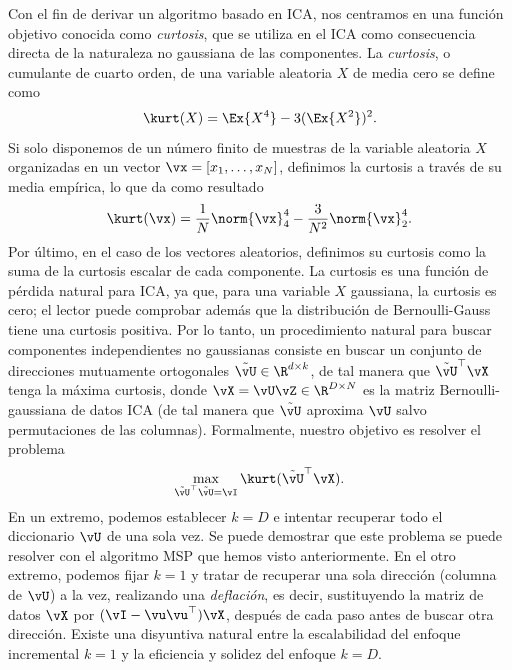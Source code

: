 \documentclass[../../book-main.tex]{subfiles}
\begin{document}
Con el fin de derivar un algoritmo basado en ICA, nos centramos en una función objetivo
conocida como \textit{curtosis}, que se utiliza en el ICA como consecuencia directa
de la naturaleza no gaussiana de las componentes. La \textit{curtosis}, o cumulante de 
cuarto orden, de una variable aleatoria $X$ de media cero se define como
\begin{equation}\label{eq:kurtosis}
    \kurt(X) = \Ex{X^4} - 3 (\Ex{X^2})^2.
\end{equation}
Si solo disponemos de un número finito de muestras de la variable aleatoria $X$ organizadas
en un vector $\vx = [x_1, \dots, x_N]$, definimos la curtosis a través de su media empírica, 
lo que da como resultado
\begin{equation}\label{eq:kurtosis-vector}
    \kurt(\vx) = \frac{1}{N} \norm{\vx}_4^4 - \frac{3}{N^2} \norm{\vx}_2^4.
\end{equation}
Por último, en el caso de los vectores aleatorios, definimos su curtosis como la suma de
la curtosis escalar de cada componente.  La curtosis es una función de pérdida natural para ICA, 
ya que, para una variable $X$ gaussiana, la curtosis es cero; el lector puede comprobar 
además que la distribución de Bernoulli-Gauss tiene una curtosis positiva.
Por lo tanto, un procedimiento natural para buscar componentes independientes no gaussianas
consiste en buscar un conjunto de direcciones mutuamente ortogonales
$\tilde{\vU} \in \R^{d \times k}$, de tal manera que $\tilde{\vU}^\top \vX$ tenga la máxima
curtosis, donde $\vX = \vU \vZ \in \R^{D \times N}$ es la
matriz Bernoulli-gaussiana de datos ICA (de tal manera que $\tilde{\vU}$ aproxima
$\vU$ salvo permutaciones de las columnas).
Formalmente, nuestro objetivo es resolver el problema
\begin{equation}
    \max_{\tilde{\vU}^\top \tilde{\vU} = \vI} \kurt(\tilde{\vU}^\top \vX).
\end{equation}
En un extremo, podemos establecer $k = D$ e intentar recuperar todo el diccionario
$\vU$ de una sola vez. Se puede demostrar que este problema se puede resolver con
el algoritmo MSP que hemos visto anteriormente.
En el otro extremo, podemos fijar $k=1$ y tratar de recuperar una sola
dirección (columna de $\vU$) a la vez, realizando una \textit{deflación},
es decir, sustituyendo la matriz de datos $\vX$ por $(\vI - \vu\vu^\top) \vX$,
después de cada paso antes de buscar otra dirección.
Existe una disyuntiva natural entre la escalabilidad del enfoque incremental $k=1$
y la eficiencia y solidez del enfoque $k=D$.
\end{document}
